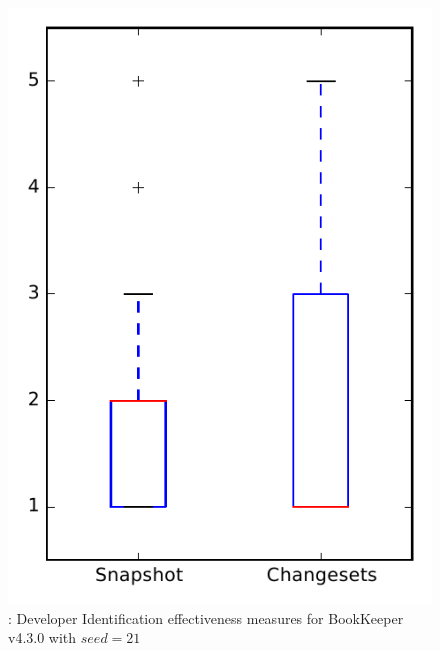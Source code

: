 
\begin{figure}
\centering
\includegraphics[height=0.4\textheight]{figures/dit_seed/rq1_bookkeeper_21}
\caption{\rtwo: Developer Identification effectiveness measures for BookKeeper v4.3.0 with $seed=21$}
\label{fig:dit_seed:rq1:bookkeeper}
\end{figure}

